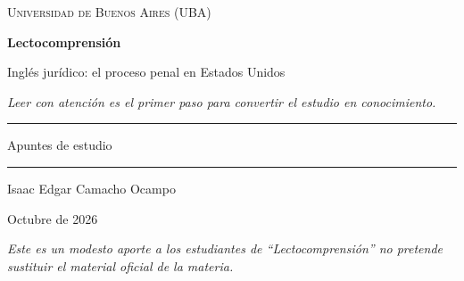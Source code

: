 \documentclass[12pt,oneside]{book}
\newcommand{\universidad}{Universidad de Buenos Aires (UBA)}
\newcommand{\materia}{Lectocomprensión}
\newcommand{\titulo}{Inglés jurídico: el proceso penal en Estados Unidos}
\newcommand{\autor}{Isaac Edgar Camacho Ocampo}
\newcommand{\anio}{Octubre de 2026}
\begin{document}
\begin{titlepage}

\thispagestyle{empty}

\begin{center}

\vspace*{1cm}

{\large \textsc{\universidad}}

\vspace{3cm}

{\Huge \textbf{\materia}}

\vspace{1cm}

{\LARGE \titulo}

\vspace{0.8cm}

\small\textit{Leer con atención es el primer paso para convertir el estudio en conocimiento.}
\normalsize

\vspace{1.2cm}

\rule{0.70\textwidth}{0.5pt}

\vspace{0.5cm}

{\large Apuntes de estudio}

\vspace{0.5cm}

\rule{0.70\textwidth}{0.5pt}

\vfill

{\large \autor}

\vspace{0.3cm}

{\large \anio}

\end{center}

\vfill

\begin{flushleft}
\textit{Este es un modesto aporte a los estudiantes de ``Lectocomprensión'' no pretende sustituir el material oficial de la materia.}
\end{flushleft}

\end{titlepage}

\frontmatter
\tableofcontents
\mainmatter
\end{document}
